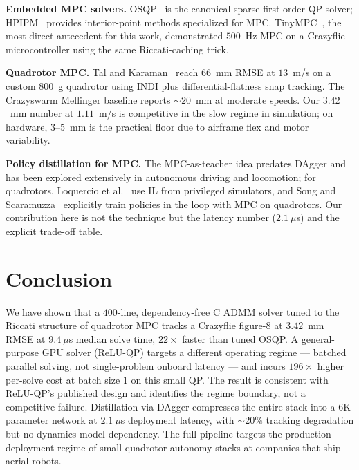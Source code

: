 \documentclass[conference]{IEEEtran}
\begin{document}
\textbf{Embedded MPC solvers.} OSQP~\cite{stellato2020osqp} is the canonical sparse first-order QP solver; HPIPM~\cite{frison2020hpipm} provides interior-point methods specialized for MPC. TinyMPC~\cite{nguyen2024tinympc}, the most direct antecedent for this work, demonstrated $500$~Hz MPC on a Crazyflie microcontroller using the same Riccati-caching trick.

\textbf{Quadrotor MPC.} Tal and Karaman~\cite{tal2021indi} reach $66$~mm RMSE at $13$~m/s on a custom $800$~g quadrotor using INDI plus differential-flatness snap tracking. The Crazyswarm Mellinger baseline reports $\sim 20$~mm at moderate speeds. Our $3.42$~mm number at $1.11$~m/s is competitive in the slow regime in simulation; on hardware, $3$--$5$~mm is the practical floor due to airframe flex and motor variability.

\textbf{Policy distillation for MPC.} The MPC-as-teacher idea predates DAgger and has been explored extensively in autonomous driving and locomotion; for quadrotors, Loquercio et al.~\cite{loquercio2021agile} use IL from privileged simulators, and Song and Scaramuzza~\cite{song2022policy} explicitly train policies in the loop with MPC on quadrotors. Our contribution here is not the technique but the latency number ($2.1~\mu$s) and the explicit trade-off table.

\section{Conclusion}

We have shown that a $400$-line, dependency-free C ADMM solver tuned to the Riccati structure of quadrotor MPC tracks a Crazyflie figure-8 at $3.42$~mm RMSE at $9.4~\mu$s median solve time, $22\times$ faster than tuned OSQP. A general-purpose GPU solver (ReLU-QP) targets a different operating regime --- batched parallel solving, not single-problem onboard latency --- and incurs $196\times$ higher per-solve cost at batch size $1$ on this small QP. The result is consistent with ReLU-QP's published design and identifies the regime boundary, not a competitive failure. Distillation via DAgger compresses the entire stack into a $6$K-parameter network at $2.1~\mu$s deployment latency, with $\sim 20\%$ tracking degradation but no dynamics-model dependency. The full pipeline targets the production deployment regime of small-quadrotor autonomy stacks at companies that ship aerial robots.
\end{document}
